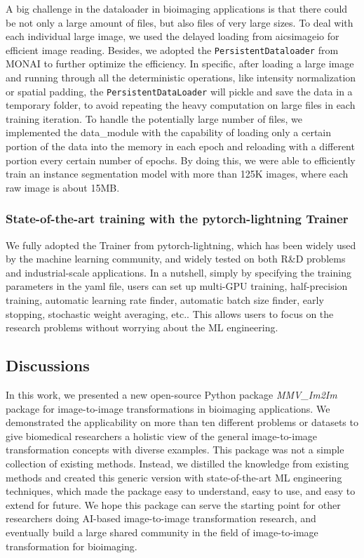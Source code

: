 A big challenge in the dataloader in bioimaging applications is that there could be not only a large amount of files, but also files of very large sizes. To deal with each individual large image, we used the delayed loading from aicsimageio for efficient image reading. Besides, we adopted the \texttt{PersistentDataloader} from MONAI to further optimize the efficiency. In specific, after loading a large image and running through all the deterministic operations, like intensity normalization or spatial padding, the \texttt{PersistentDataLoader} will pickle and save the data in a temporary folder, to avoid repeating the heavy computation on large files in each training iteration. To handle the potentially large number of files, we implemented the data\_module with the capability of loading only a certain portion of the data into the memory in each epoch and reloading with a different portion every certain number of epochs. By doing this, we were able to efficiently train an instance segmentation model with more than 125K images, where each raw image is about 15MB.

\hypertarget{state-of-the-art-training-with-the-pytorch-lightning-trainer}{%
\subsubsection{State-of-the-art training with the pytorch-lightning Trainer}\label{state-of-the-art-training-with-the-pytorch-lightning-trainer}}

We fully adopted the Trainer from pytorch-lightning, which has been widely used by the machine learning community, and widely tested on both R\&D problems and industrial-scale applications. In a nutshell, simply by specifying the training parameters in the yaml file, users can set up multi-GPU training, half-precision training, automatic learning rate finder, automatic batch size finder, early stopping, stochastic weight averaging, etc.. This allows users to focus on the research problems without worrying about the ML engineering.

\hypertarget{discussions}{%
\subsection{Discussions}\label{discussions}}

In this work, we presented a new open-source Python package \emph{MMV\_Im2Im} package for image-to-image transformations in bioimaging applications. We demonstrated the applicability on more than ten different problems or datasets to give biomedical researchers a holistic view of the general image-to-image transformation concepts with diverse examples. This package was not a simple collection of existing methods. Instead, we distilled the knowledge from existing methods and created this generic version with state-of-the-art ML engineering techniques, which made the package easy to understand, easy to use, and easy to extend for future. We hope this package can serve the starting point for other researchers doing AI-based image-to-image transformation research, and eventually build a large shared community in the field of image-to-image transformation for bioimaging.

